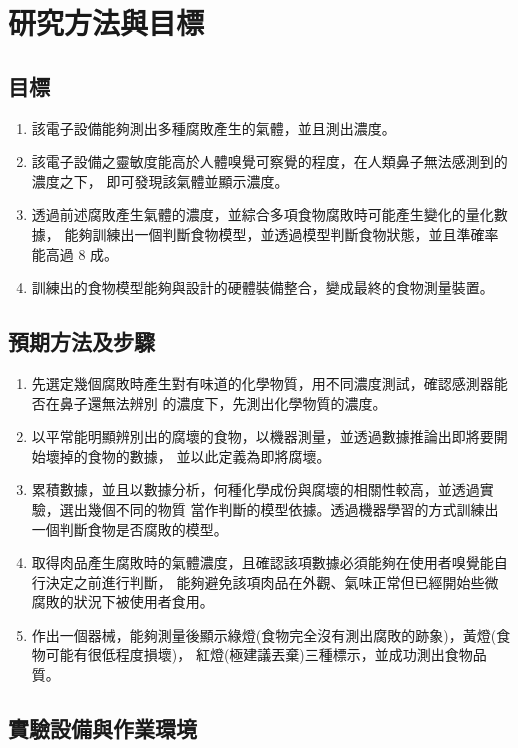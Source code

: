 \chapter{研究方法與目標}

\section{目標}
\begin{enumerate}
	\item 該電子設備能夠測出多種腐敗產生的氣體，並且測出濃度。
	\item 該電子設備之靈敏度能高於人體嗅覺可察覺的程度，在人類鼻子無法感測到的濃度之下，
		即可發現該氣體並顯示濃度。
	\item 透過前述腐敗產生氣體的濃度，並綜合多項食物腐敗時可能產生變化的量化數據，
		能夠訓練出一個判斷食物模型，並透過模型判斷食物狀態，並且準確率能高過 8 成。 
	\item 訓練出的食物模型能夠與設計的硬體裝備整合，變成最終的食物測量裝置。
\end{enumerate}

\section{預期方法及步驟}
\begin{enumerate}
	\item 先選定幾個腐敗時產生對有味道的化學物質，用不同濃度測試，確認感測器能否在鼻子還無法辨別
		的濃度下，先測出化學物質的濃度。
	\item 以平常能明顯辨別出的腐壞的食物，以機器測量，並透過數據推論出即將要開始壞掉的食物的數據，
		並以此定義為即將腐壞。 
	\item 累積數據，並且以數據分析，何種化學成份與腐壞的相關性較高，並透過實驗，選出幾個不同的物質
		當作判斷的模型依據。透過機器學習的方式訓練出一個判斷食物是否腐敗的模型。
	\item 取得肉品產生腐敗時的氣體濃度，且確認該項數據必須能夠在使用者嗅覺能自行決定之前進行判斷，
		能夠避免該項肉品在外觀、氣味正常但已經開始些微腐敗的狀況下被使用者食用。
	\item 作出一個器械，能夠測量後顯示綠燈(食物完全沒有測出腐敗的跡象)，黃燈(食物可能有很低程度損壞)，
		紅燈(極建議丟棄)三種標示，並成功測出食物品質。 
\end{enumerate}

\section{實驗設備與作業環境}
